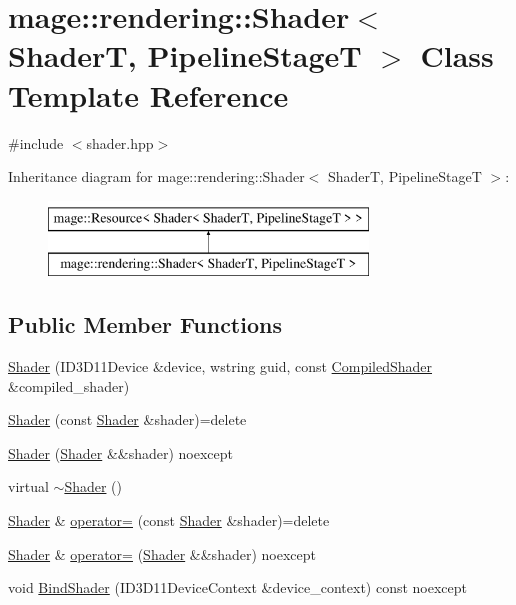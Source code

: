 \hypertarget{classmage_1_1rendering_1_1_shader}{}\section{mage\+:\+:rendering\+:\+:Shader$<$ ShaderT, Pipeline\+StageT $>$ Class Template Reference}
\label{classmage_1_1rendering_1_1_shader}


{\ttfamily \#include $<$shader.\+hpp$>$}

Inheritance diagram for mage\+:\+:rendering\+:\+:Shader$<$ ShaderT, Pipeline\+StageT $>$\+:\begin{figure}[H]
\begin{center}
\leavevmode
\includegraphics[height=2.000000cm]{classmage_1_1rendering_1_1_shader}
\end{center}
\end{figure}
\subsection*{Public Member Functions}
\begin{DoxyCompactItemize}
\item 
\hyperlink{classmage_1_1rendering_1_1_shader_a00fe99edc760763ede9dd414b286c820}{Shader} (I\+D3\+D11\+Device \&device, wstring guid, const \hyperlink{classmage_1_1rendering_1_1_compiled_shader}{Compiled\+Shader} \&compiled\+\_\+shader)
\item 
\hyperlink{classmage_1_1rendering_1_1_shader_a4ca3a1e4f108e38d28c0ba3df4f234f6}{Shader} (const \hyperlink{classmage_1_1rendering_1_1_shader}{Shader} \&shader)=delete
\item 
\hyperlink{classmage_1_1rendering_1_1_shader_a65ecc5e4958ce06d7dfa8632dccc774f}{Shader} (\hyperlink{classmage_1_1rendering_1_1_shader}{Shader} \&\&shader) noexcept
\item 
virtual \hyperlink{classmage_1_1rendering_1_1_shader_af9774a6a1f073f0477c5f4e35f130181}{$\sim$\+Shader} ()
\item 
\hyperlink{classmage_1_1rendering_1_1_shader}{Shader} \& \hyperlink{classmage_1_1rendering_1_1_shader_a66253b5dd8a5ef1cd766512b4ab15e6c}{operator=} (const \hyperlink{classmage_1_1rendering_1_1_shader}{Shader} \&shader)=delete
\item 
\hyperlink{classmage_1_1rendering_1_1_shader}{Shader} \& \hyperlink{classmage_1_1rendering_1_1_shader_a940217c505f3994d1f6057345d52cb36}{operator=} (\hyperlink{classmage_1_1rendering_1_1_shader}{Shader} \&\&shader) noexcept
\item 
void \hyperlink{classmage_1_1rendering_1_1_shader_abb37464c991b9b49e94c93968e884f13}{Bind\+Shader} (I\+D3\+D11\+Device\+Context \&device\+\_\+context) const noexcept
\end{DoxyCompactItemize}
